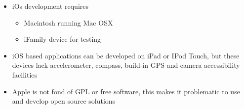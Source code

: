 	\begin{itemize}
		\item iOs development requires
			\begin{itemize}
				\item Macintosh running Mac OSX
				\item iFamily device for testing
			\end{itemize}
		\item iOS based applications can be developed on iPad or IPod Touch, but
		these devices lack accelerometer, compass, build-in GPS and camera
		accessibility facilities
		\item Apple is not fond of GPL or free software, this makes it
		problematic to use and develop open source solutions 
	\end{itemize}



